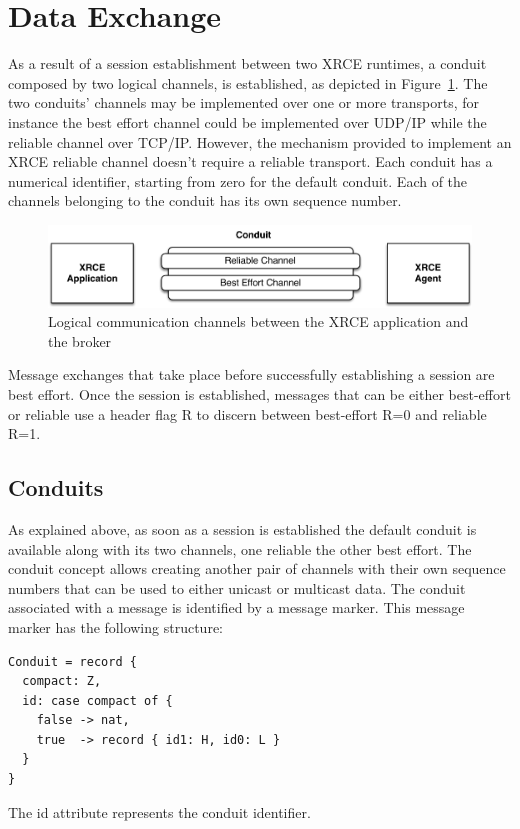 \documentclass[a4paper,oneside,article]{memoir}
\begin{document}
\section{Data Exchange}

As a result of a session establishment between two XRCE runtimes, a conduit composed by two logical
channels, is established, as depicted in Figure~\ref{fig:xrce-conduit}.  The two conduits’ channels
may be implemented over one or more transports, for instance the best effort channel could be
implemented over UDP/IP while the reliable channel over TCP/IP\@.  However, the mechanism provided
to implement an XRCE reliable channel doesn’t require a reliable transport.  Each conduit has a
numerical identifier, starting from zero for the default conduit.  Each of the channels belonging to
the conduit has its own sequence number.

\begin{figure}
\centering
\includegraphics[scale=0.6]{xrce-conduit.pdf}
\caption{Logical communication channels between the XRCE application and the broker}\label{fig:xrce-conduit}
\end{figure}

Message exchanges that take place before successfully establishing a session are best effort.  Once
the session is established, messages that can be either best-effort or reliable use a header flag R
to discern between best-effort R=0 and reliable R=1.

\subsection{Conduits}

As explained above, as soon as a session is established the default conduit is available along with
its two channels, one reliable the other best effort.  The conduit concept allows creating another
pair of channels with their own sequence numbers that can be used to either unicast or multicast
data.  The conduit associated with a message is identified by a message marker.  This message marker
has the following structure:
\begin{verbatim}
Conduit = record {
  compact: Z,
  id: case compact of {
    false -> nat,
    true  -> record { id1: H, id0: L }
  }
}
\end{verbatim}
The id attribute represents the conduit identifier.
\end{document}
